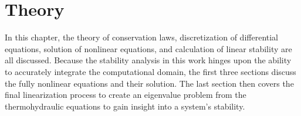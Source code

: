 \chapter{Theory}\label{Chapter:Theory}

In this chapter, the theory of conservation laws, discretization of differential equations, solution of nonlinear equations, and calculation of linear stability are all discussed.
Because the stability analysis in this work hinges upon the ability to accurately integrate the computational domain, the first three sections discuss the fully nonlinear equations and their solution.
The last section then covers the final linearization process to create an eigenvalue problem from the thermohydraulic equations to gain insight into a system's stability.




